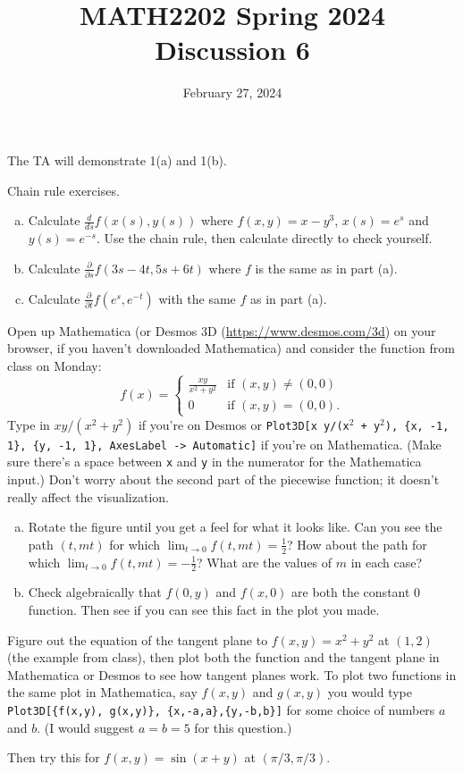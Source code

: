 \documentclass[11pt,oneside]{amsart}
\title{MATH2202 Spring 2024\\
Discussion 6}
\date{February 27, 2024}
\theoremstyle{definition}
\begin{document}
  \maketitle

  The TA will demonstrate 1(a) and 1(b).

  \begin{problem}
    Chain rule exercises.
    \begin{enumerate}[(a)]
      \item Calculate $\frac d{ds}f(x(s),y(s))$ where $f(x,y)=x-y^3$, $x(s)=e^s$ and $y(s)=e^{-s}$. Use the chain rule, then calculate directly to check yourself.
      \item Calculate $\frac{\partial}{\partial s}f(3s-4t,5s+6t)$ where $f$ is the same as in part (a).
      \item Calculate $\frac{\partial}{\partial t}f(e^s,e^{-t})$ with the same $f$ as in part (a).
    \end{enumerate}
  \end{problem}

  \begin{problem}
    Open up Mathematica (or Desmos 3D (\url{https://www.desmos.com/3d}) on your browser, if you haven't downloaded Mathematica) and consider the function from class on Monday:
    \[f(x)=\begin{cases}\frac{xy}{x^2+y^2}&\text{if }(x,y)\neq(0,0)\\0&\text{if }(x,y)=(0,0).\end{cases}\]
    Type in $xy/(x^2+y^2)$ if you're on Desmos or \texttt{Plot3D[x y/(x$^2$ + y$^2$), \{x, -1, 1\}, \{y, -1, 1\},
    AxesLabel -> Automatic]} if you're on Mathematica. (Make sure there's a space between \texttt{x} and \texttt{y} in the numerator for the Mathematica input.) Don't worry about the second part of the piecewise function; it doesn't really affect the visualization.
    \begin{enumerate}[(a)]
      \item Rotate the figure until you get a feel for what it looks like. Can you see the path $(t,mt)$ for which $\lim_{t\to 0}f(t,mt)=\frac12$? How about the path for which $\lim_{t\to 0}f(t,mt)=-\frac12$? What are the values of $m$ in each case?
      \item Check algebraically that $f(0,y)$ and $f(x,0)$ are both the constant 0 function. Then see if you can see this fact in the plot you made.
    \end{enumerate}
  \end{problem}

  \begin{problem}
    Figure out the equation of the tangent plane to $f(x,y)=x^2+y^2$ at $(1,2)$ (the example from class), then plot both the function and the tangent plane in Mathematica or Desmos to see how tangent planes work. To plot two functions in the same plot in Mathematica, say $f(x,y)$ and $g(x,y)$ you would type \texttt{Plot3D[\{f(x,y), g(x,y)\}, \{x,-a,a\},\{y,-b,b\}]} for some choice of numbers $a$ and $b$. (I would suggest $a=b=5$ for this question.)

    Then try this for $f(x,y)=\sin(x+y)$ at $(\pi/3,\pi/3)$.
  \end{problem}
\end{document}

